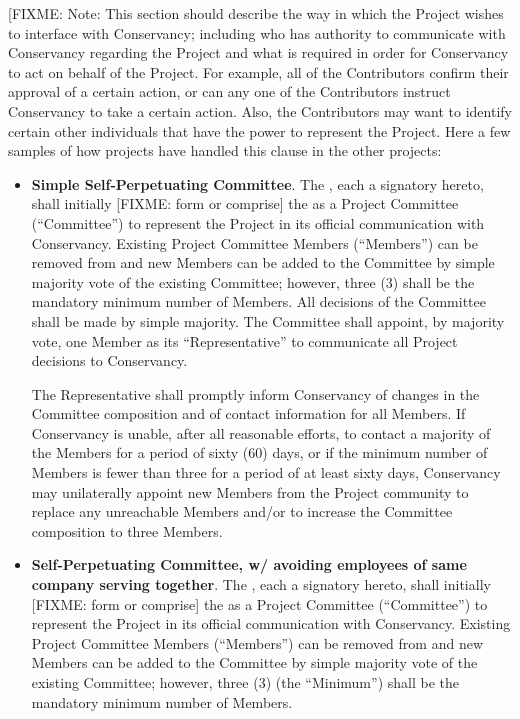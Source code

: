 [FIXME: Note: This section should describe the way in which the
Project wishes to interface with Conservancy; including who has
authority to communicate with Conservancy regarding the Project
and what is required in order for Conservancy to act on behalf
of the Project. For example, all of the Contributors confirm their
approval of a certain action, or can any one of the Contributors instruct
Conservancy to take a certain action. Also, the Contributors may
want to identify certain other individuals that have the power to
represent the Project. Here a few samples of how projects have handled
this clause in the other projects:

\begin{itemize}
\item \textbf{Simple Self-Perpetuating Committee}. The \signatories{},
each a signatory hereto, shall initially [FIXME: form or comprise]
the \leadershipbody{} as a Project Committee (``Committee'')
to represent the Project in its official communication with Conservancy.
Existing Project Committee Members (``Members'') can be removed
from and new Members can be added to the Committee by simple majority
vote of the existing Committee; however, three (3) shall be the mandatory
minimum number of Members. All decisions of the Committee shall be
made by simple majority. The Committee shall appoint, by majority
vote, one Member as its ``Representative'' to communicate all Project
decisions to Conservancy.


The Representative shall promptly inform Conservancy of changes in
the Committee composition and of contact information for all Members.
If Conservancy is unable, after all reasonable efforts, to contact
a majority of the Members for a period of sixty (60) days, or if the
minimum number of Members is fewer than three for a period of at least
sixty days, Conservancy may unilaterally appoint new Members from
the Project community to replace any unreachable Members and/or to
increase the Committee composition to three Members.

\item \textbf{Self-Perpetuating Committee, w/ avoiding employees of same
company serving together}. The \signatories{}, each a signatory
hereto, shall initially [FIXME: form or comprise] the \leadershipbody{}
as a Project Committee (``Committee'') to represent the Project
in its official communication with Conservancy. Existing Project
Committee Members (``Members'') can be removed from and new Members
can be added to the Committee by simple majority vote of the existing
Committee; however, three (3) (the ``Minimum'') shall be the mandatory
minimum number of Members.



\end{itemize}
